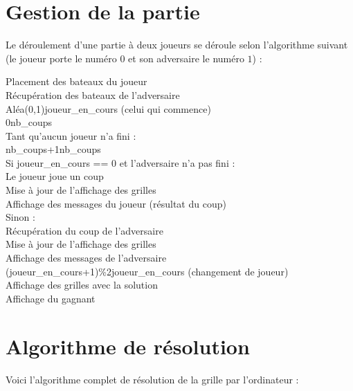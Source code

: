 \newpage
\section{Gestion de la partie}

Le déroulement d'une partie à deux joueurs se déroule selon l'algorithme suivant (le joueur porte le numéro $0$ et son adversaire le numéro $1$) :

\begin{algo1}\label{algo_partie}
Placement des bateaux du joueur\\
Récupération des bateaux de l'adversaire\\
Aléa(0,1)\sto joueur\_en\_cours (celui qui commence)\\
0\sto nb\_coups\\
Tant qu'aucun joueur n'a fini :\\
nb\_coups+1\sto nb\_coups\\
Si joueur\_en\_cours == 0 et l'adversaire n'a pas fini :\\
Le joueur joue un coup\\
Mise à jour de l'affichage des grilles\\
Affichage des messages du joueur (résultat du coup)\\
Sinon :\\
Récupération du coup de l'adversaire\\
Mise à jour de l'affichage des grilles\\
Affichage des messages de l'adversaire\\
(joueur\_en\_cours+1)\%2\sto joueur\_en\_cours (changement de joueur)\\
Affichage des grilles avec la solution\\
Affichage du gagnant\\
\end{algo1}

\newpage
\section{Algorithme de résolution}\label{algo_resolution}
Voici l'algorithme complet de résolution de la grille par l'ordinateur :

